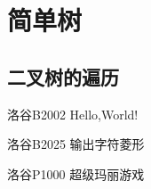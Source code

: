 \chapter{简单树}
\section{二叉树的遍历}



\begin{problemset}
\item 洛谷B2002 Hello,World!
\item 洛谷B2025 输出字符菱形
\item 洛谷P1000 超级玛丽游戏
\end{problemset}


